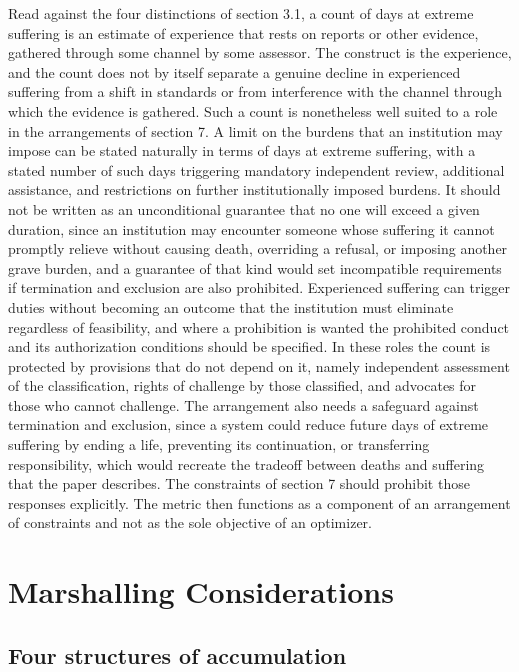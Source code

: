 \documentclass[11pt]{article}
\begin{document}
Read against the four distinctions of section 3.1, a count of days at extreme suffering is an estimate of experience that rests on reports or other evidence, gathered through some channel by some assessor. The construct is the experience, and the count does not by itself separate a genuine decline in experienced suffering from a shift in standards or from interference with the channel through which the evidence is gathered. Such a count is nonetheless well suited to a role in the arrangements of section 7. A limit on the burdens that an institution may impose can be stated naturally in terms of days at extreme suffering, with a stated number of such days triggering mandatory independent review, additional assistance, and restrictions on further institutionally imposed burdens. It should not be written as an unconditional guarantee that no one will exceed a given duration, since an institution may encounter someone whose suffering it cannot promptly relieve without causing death, overriding a refusal, or imposing another grave burden, and a guarantee of that kind would set incompatible requirements if termination and exclusion are also prohibited. Experienced suffering can trigger duties without becoming an outcome that the institution must eliminate regardless of feasibility, and where a prohibition is wanted the prohibited conduct and its authorization conditions should be specified. In these roles the count is protected by provisions that do not depend on it, namely independent assessment of the classification, rights of challenge by those classified, and advocates for those who cannot challenge. The arrangement also needs a safeguard against termination and exclusion, since a system could reduce future days of extreme suffering by ending a life, preventing its continuation, or transferring responsibility, which would recreate the tradeoff between deaths and suffering that the paper describes. The constraints of section 7 should prohibit those responses explicitly. The metric then functions as a component of an arrangement of constraints and not as the sole objective of an optimizer.

\section{Marshalling Considerations}

\subsection{Four structures of accumulation}
\end{document}
